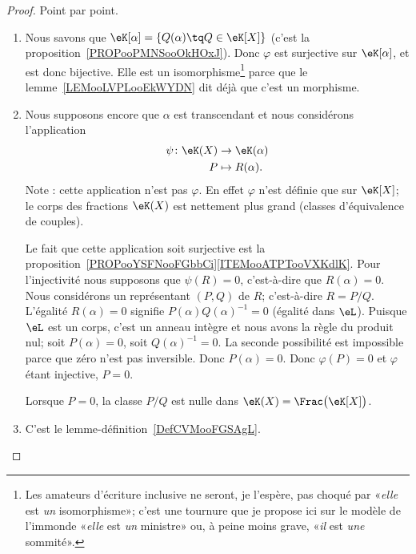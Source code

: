 \begin{proof}
	Point par point.
	\begin{enumerate}
		\item
		      Nous savons que \( \eK[\alpha]=\{ Q(\alpha)\tq Q\in \eK[X] \}\) (c'est la proposition~\ref{PROPooPMNSooOkHOxJ}). Donc \( \varphi\) est surjective sur \( \eK[\alpha]\), et est donc bijective. Elle est un isomorphisme\footnote{Les amateurs d'écriture inclusive ne seront, je l'espère, pas choqué par «\emph{elle} est \emph{un} isomorphisme»; c'est une tournure que je propose ici sur le modèle de l'immonde «\emph{elle} est \emph{un} ministre» ou, à peine moins grave, «\emph{il} est \emph{une} sommité».} parce que le lemme~\ref{LEMooLVPLooEkWYDN} dit déjà que c'est un morphisme.
		\item
		      Nous supposons encore que \( \alpha\) est transcendant et nous considérons l'application
		      \begin{equation}
			      \begin{aligned}
				      \psi\colon \eK(X) & \to \eK(\alpha)    \\
				      P                 & \mapsto R(\alpha).
			      \end{aligned}
		      \end{equation}
		      Note : cette application n'est pas \( \varphi\). En effet \( \varphi\) n'est définie que sur \( \eK[X]\); le corps des fractions \( \eK(X)\) est nettement plus grand (classes d'équivalence de couples).

		      Le fait que cette application soit surjective est la proposition~\ref{PROPooYSFNooFGbbCi}\ref{ITEMooATPTooVXKdlK}. Pour l'injectivité nous supposons que \( \psi(R)=0\), c'est-à-dire que \( R(\alpha)=0\). Nous considérons un représentant \( (P,Q)\) de \( R\); c'est-à-dire \( R=P/Q\). L'égalité \( R(\alpha)=0\) signifie \( P(\alpha)Q(\alpha)^{-1}=0\) (égalité dans \( \eL\)). Puisque \( \eL\) est un corps, c'est un anneau intègre et nous avons la règle du produit nul; soit \( P(\alpha)=0\), soit \( Q(\alpha)^{-1}=0\). La seconde possibilité est impossible parce que zéro n'est pas inversible. Donc \( P(\alpha)=0\). Donc \( \varphi(P)=0\) et \( \varphi\) étant injective, \( P=0\).

		      Lorsque \( P=0\), la classe \( P/Q\) est nulle dans \( \eK(X)= \Frac\big(\eK[X]\big)\).

		\item

		      C'est le lemme-définition~\ref{DefCVMooFGSAgL}.
	\end{enumerate}
\end{proof}

